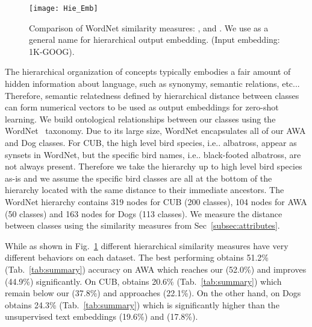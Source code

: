 \documentclass[10pt,twocolumn,letterpaper]{article}
\makeatletter
\newcommand{\cutcaptiondown}{\vspace*{-0.12in}}
\newcommand{\myparagraph}[1]{\vspace{2pt}\noindent{\bf #1}}
\DeclareRobustCommand\onedot{\futurelet\@let@token\@onedot}
\def\@onedot{\ifx\@let@token.\else.\null\fi\xspace}
\def\ie{{i.e}\onedot} \def\Ie{{I.e}\onedot}
\def\etc{{etc}\onedot} \def\vs{{vs}\onedot}
\makeatother
\begin{document}
\begin{figure}[t]
   \centering
   \texttt{[image: Hie\_Emb]}
\caption{Comparison of WordNet similarity measures: ,  and . We use  as a general name for hierarchical output embedding. (Input embedding: 1K-GOOG).} 
\cutcaptiondown
\label{fig:hie}
\end{figure}


\myparagraph{Hierarchical Embeddings.}  
The hierarchical organization of concepts typically embodies a fair amount of hidden information about language, such as synonymy, semantic relations, \etc. Therefore, semantic relatedness defined by hierarchical distance between classes can form numerical vectors to be used as output embeddings for zero-shot learning. 
We build ontological relationships between our classes using the WordNet~\cite{WordNet} taxonomy. Due to its large size, WordNet encapsulates all of our AWA and Dog classes.
For CUB, the high level bird species, \ie albatross, appear as synsets in WordNet, but the specific bird names, \ie black-footed albatross, are not always present.
Therefore we take the hierarchy up to high level bird species as-is and we assume the specific bird classes are all at the bottom of the hierarchy located with the same distance to their immediate ancestors. The WordNet hierarchy contains 319 nodes for CUB (200 classes), 104 nodes for AWA (50 classes) and 163 nodes for Dogs (113 classes).
We measure the distance between classes using the similarity measures from Sec~\ref{subsec:attributes}. 

While as shown in Fig.~\ref{fig:hie} different hierarchical similarity measures have very different behaviors on each dataset. 
The best performing  obtains 51.2\% (Tab.~\ref{tab:summary}) accuracy on AWA which reaches our  (52.0\%) and improves  (44.9\%) significantly. On CUB,  obtains 20.6\% (Tab.~\ref{tab:summary}) which remain below our  (37.8\%) and approaches  (22.1\%). On the other hand, on Dogs  obtains 24.3\% (Tab.~\ref{tab:summary}) which is significantly higher than the unsupervised text embeddings  (19.6\%) and  (17.8\%).


\newcommand{\vv}{\checkmark}
\end{document}
